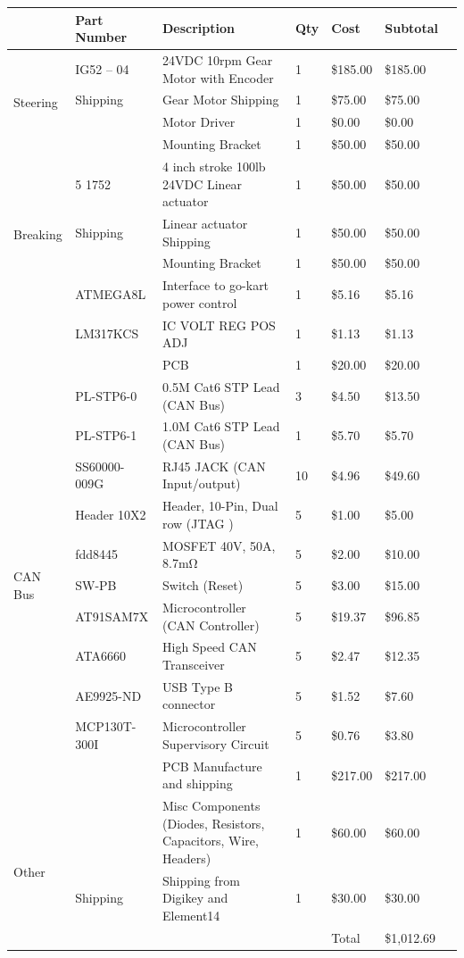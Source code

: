 {\small
\begin{tabular}{ | l | l | p{} | l | l | l | l | }
\hline
 & Part Number & Description & Qty & Cost & Subtotal \\
\hline
\multirow{4}{*}{Steering} & IG52 – 04 & 24VDC 10rpm Gear Motor with Encoder & 1 & \$185.00 & \$185.00 \\
 & Shipping & Gear Motor Shipping & 1 & \$75.00 & \$75.00 \\
 &  & Motor Driver & 1 & \$0.00 & \$0.00 \\
 &  & Mounting Bracket & 1 & \$50.00 & \$50.00 \\
\hline
\multirow{4}{*}{Breaking} & 5 1752 & 4 inch stroke 100lb 24VDC Linear actuator  & 1 & \$50.00 & \$50.00 \\
 & Shipping & Linear actuator Shipping & 1 & \$50.00 & \$50.00 \\
 &  & Mounting Bracket & 1 & \$50.00 & \$50.00 \\
\hline
\multirow{3}{*}{Accelerator} & ATMEGA8L & Interface to go-kart power control & 1 & \$5.16 & \$5.16 \\
 & LM317KCS & IC VOLT REG POS ADJ & 1 & \$1.13 & \$1.13 \\
 &  & PCB & 1 & \$20.00 & \$20.00 \\
\hline
\multirow{11}{*}{CAN Bus} & PL-STP6-0 & 0.5M Cat6 STP Lead (CAN Bus) & 3 & \$4.50 & \$13.50 \\
 & PL-STP6-1 & 1.0M Cat6 STP Lead (CAN Bus) & 1 & \$5.70 & \$5.70 \\
 & SS60000-009G & RJ45 JACK (CAN Input/output) & 10 & \$4.96 & \$49.60 \\
 & Header 10X2 & Header, 10-Pin, Dual row (JTAG ) & 5 & \$1.00 & \$5.00 \\
 & fdd8445 & MOSFET 40V, 50A, 8.7mΩ & 5 & \$2.00 & \$10.00 \\
 & SW-PB & Switch (Reset) & 5 & \$3.00 & \$15.00 \\
 & AT91SAM7X & Microcontroller (CAN Controller) & 5 & \$19.37 & \$96.85 \\
 & ATA6660 & High Speed CAN Transceiver & 5 & \$2.47 & \$12.35 \\
 & AE9925-ND & USB Type B connector & 5 & \$1.52 & \$7.60 \\
 & MCP130T-300I & Microcontroller Supervisory Circuit & 5 & \$0.76 & \$3.80 \\
 &  & PCB Manufacture and shipping & 1 & \$217.00 & \$217.00 \\
\hline
\multirow{4}{*}{Other} &  & Misc Components (Diodes, Resistors, Capacitors, Wire, Headers) & 1 & \$60.00 & \$60.00 \\
 & Shipping & Shipping from Digikey and Element14 & 1 & \$30.00 & \$30.00 \\
\hline
 &  &  &  & Total & \$1,012.69 \\
\hline
\end{tabular}
}



